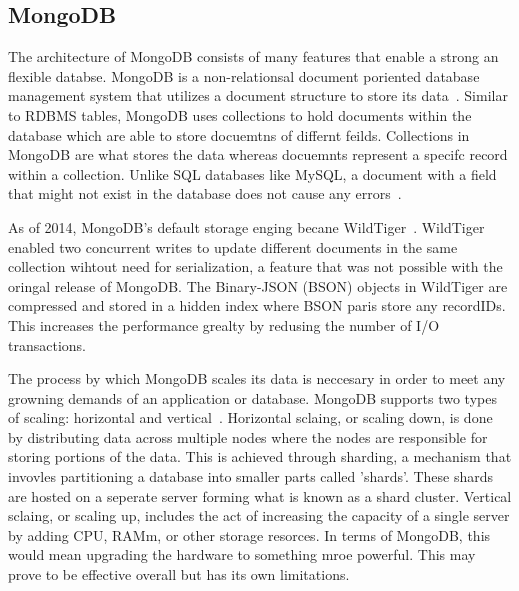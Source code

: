 \documentclass[sigconf]{acmart}
\begin{document}
        \subsection{MongoDB}
    The architecture of MongoDB consists of many features that enable a strong an flexible databse. MongoDB is a non-relationsal document poriented database management system that utilizes a document structure to store its data~\cite{Geeks4geeksMongo}. Similar to RDBMS tables, MongoDB uses collections to hold documents within the database which are able to store docuemtns of differnt feilds. Collections in MongoDB are what stores the data whereas docuemnts represent a specifc record within a collection. Unlike SQL databases like MySQL, a document with a field that might not exist in the database does not cause any errors~\cite{Mongo-Medium}. 
    
    As of 2014, MongoDB's default storage enging becane WildTiger~\cite{Mongo-Medium}. WildTiger enabled two concurrent writes to update different documents in the same collection wihtout need for serialization, a feature that was not possible with the oringal release of MongoDB. The Binary-JSON (BSON) objects in WildTiger are compressed and stored in a hidden index where BSON paris store any recordIDs. This increases the performance grealty by redusing the number of I/O transactions.


    The process by which MongoDB scales its data is neccesary in order to meet any growning demands of an application or database. MongoDB supports two types of scaling: horizontal and vertical~\cite{Mongo-scalability}. Horizontal sclaing, or scaling down, is done by distributing data across multiple nodes where the nodes are responsible for storing portions of the data. This is achieved through sharding, a mechanism that invovles partitioning a database into smaller parts called 'shards'. These shards are hosted on a seperate server forming what is known as a shard cluster. Vertical sclaing, or scaling up, includes the act of increasing the capacity of a single server by adding CPU, RAMm, or other storage resorces. In terms of MongoDB, this would mean upgrading the hardware to something mroe powerful. This may prove to be effective overall but has its own limitations. 
\end{document}
